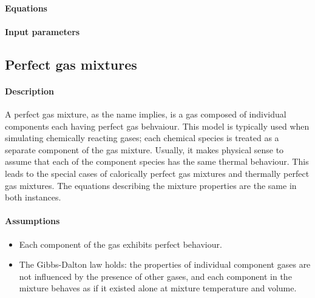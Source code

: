 \paragraph{Equations}
\paragraph{Input parameters}


\subsection{Perfect gas mixtures}
\label{sec:pgm}
\paragraph{Description}
A perfect gas mixture, as the name implies, is a gas composed
of individual components each having perfect gas behvaiour.
This model is typically used when simulating chemically
reacting gases; each chemical species is treated as a separate
component of the gas mixture.
Usually, it makes physical sense to assume that each of the component species
has the same thermal behaviour.
This leads to the special cases of calorically perfect gas mixtures and
thermally perfect gas mixtures.
The equations describing the mixture properties are the same in both
instances. 

\paragraph{Assumptions}
\begin{itemize}
\item Each component of the gas exhibits perfect behaviour.
\item The Gibbs-Dalton law holds: the properties of individual
      component gases are not influenced by the presence of
      other gases, and each component in the mixture behaves
      as if it existed alone at mixture temperature and volume.
\end{itemize}

